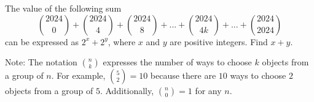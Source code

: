 The value of the following sum \[{2024 \choose 0}+{2024  \choose 4}+{2024  \choose 8}+ ... +{2024  \choose 4k}+ ... +{2024  \choose 2024}\]can be expressed as $2^x + 2^y$, where $x$ and $y$ are positive integers. Find $x + y$.



Note: The notation ${n \choose k}$ expresses the number of ways to choose $k$ objects from a group of $n$. For example, ${5  \choose 2}= 10$ because there are $10$ ways to choose $2$ objects from a group of $5$. Additionally, ${n  \choose 0}= 1$ for any $n$.
